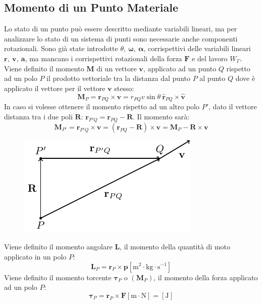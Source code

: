 \documentclass{article}
\newcommand{\vect}[1]{\boldsymbol{\mathbf{#1}}}
\numberwithin{equation}{subsection}
\begin{document}
\subsection{Momento di un Punto Materiale}


Lo stato di un punto può essere descritto mediante variabili 
lineari, ma per analizzare lo stato di un sistema di punti 
sono necessarie anche componenti rotazionali. Sono già state 
introdotte $\theta,\:\vect{\omega},\:\vect{\alpha}$, corrispettivi 
delle variabili lineari $\vect{r},\:\vect{v},\:\vect{a}$, ma 
mancano i corrispettivi rotazionali della forza $\vect{F}$ 
e del lavoro $W_{\Gamma}$. 
\\
Viene definito il momento $\vect{M}$ di un vettore $\vect{v}$, applicato ad un punto $Q$ rispetto ad 
un polo $P$ il prodotto vettoriale tra la distanza dal punto 
$P$ al punto $Q$ dove è applicato il vettore per il vettore $\vect{v}$ stesso: 
\begin{equation*}
    \vect{M}_P=\vect{r}_{PQ}\times\vect{v}=r_{PQ}v\sin\theta\:\hat{\vect{r}}_{PQ}\times\hat{\vect{v}}
\end{equation*}
In caso si volesse ottenere il momento rispetto ad un altro polo 
$P'$, dato  il vettore distanza tra i due poli $\vect{R}$: 
$\vect{r}_{P'Q}=\vect{r}_{PQ}-\vect{R}$. Il momento sarà:
\begin{equation*}
    \vect{M}_{P'}=\vect{r}_{P'Q}\times\vect{v}=(\vect{r}_{PQ}-\vect{R})\times\vect{v}=\vect{M}_P-\vect{R}\times\vect{v}
\end{equation*}

\begin{figure}[H]%
    \centering
    \includegraphics{momento-vettore.pdf}%
\end{figure}

Viene definito il momento angolare $\vect{L}$, il momento della 
quantità di moto applicato in un polo $P$:
\begin{equation} 
    \vect{L}_P=\vect{r}_P\times\vect{p}\left[\mathrm{m}^2\cdot \mathrm{kg}\cdot\mathrm{s}^{-1}\right]
\end{equation}
Viene definito il momento torcente $\vect{\tau}_P$ o $(\vect{M}_P)$, il momento della forza applicato 
ad un polo $P$:
\begin{equation}
    \vect{\tau}_P=\vect{r}_P\times\vect{F}\left[\mathrm{m}\cdot \mathrm{N}\right]=[\mathrm{J}]
\end{equation}
\end{document}
